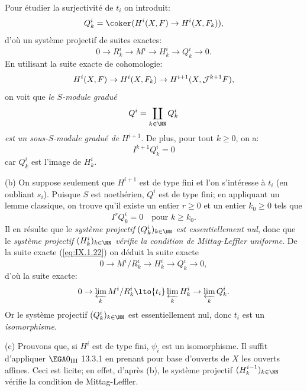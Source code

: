 Pour \'etudier la surjectivit\'e de $t_i$ on introduit:
\begin{equation} \label{eq:IX.1.21} Q_k^i = \coker (H^i(X, F) \to H^i(X, F_k)),
\end{equation}
d'o\`u un syst\`eme projectif de suites exactes:
\begin{equation} \label{eq:IX.1.22} 0\to R_k^i \to M^i \to H^i_k \to Q_k^i \to 0.
\end{equation}
En utilisant la suite exacte de cohomologie:
\begin{equation} \label{eq:IX.1.23}
H^i(X, F)\to H^i(X, F_k)\to H^{i+1}(X, {\mathcal J}^{k+1}F),
\end{equation}
on voit que \emph{le $S$-module gradué}
\begin{equation} \label{eq:IX.1.24}
Q^i=\coprod_{k \in \NN}Q^i_k
\end{equation}
\emph{est un sous-}$S$\emph{-module gradué de} $H^{i+1}$. De plus, pour tout $k\geq 0$, on a:
\begin{equation} \label{eq:IX.1.25}
I^{k+1}Q^i_k=0
\end{equation}
car $Q_k^i$ est l'image de $H^i_k$.

\textup{(b)} \label{stepb} On suppose seulement que $H^{i+1}$ est de type fini et l'on s'int\'eresse \`a $t_i$ (en oubliant $s_i$). Puisque $S$ est noeth\'erien, $Q^i$ est de type fini; en appliquant un lemme classique, on trouve qu'il existe un entier $r\geq 0$ et un entier $k_0\geq 0$ tels que
\begin{equation} \label{eq:IX.1.26}
I^rQ_k^i=0 \quad \text{pour } k\geq k_0.
\end{equation}
Il en r\'esulte que le \emph{système projectif} $(Q_k^i)_{k\in \NN}$ \emph{est essentiellement nul}, donc que le \emph{système projectif $(H_k^i)_{k\in \NN}$ vérifie la condition de Mittag-Leffler uniforme}. De la suite exacte (\ref{eq:IX.1.22}) on d\'eduit la suite exacte
\begin{equation} \label{eq:IX.1.27}
0 \to M^i/R_k^i \to H^i_k \to Q_k^i \to 0,
\end{equation}
d'o\`u la suite exacte:
\begin{equation} \label{eq:IX.1.28}
0\to\varprojlim_{k}M^i/R_k^i \lto{t_i} \varprojlim_{k}H^i_k \to \varprojlim_{k} Q_k^i.
\end{equation}
Or le syst\`eme projectif $(Q_k^i)_{k\in \NN}$ est essentiellement nul, donc $t_i$ est un \emph{isomorphisme}.

\indent\textup{(c)} Prouvons que, si $H^i$ est de type fini, $\psi_i$ est un isomorphisme. Il suffit d'appliquer $\EGA 0_{\textup{III}}$ 13.3.1 en prenant pour base d'ouverts de $X$ les ouverts affines. Ceci est licite; en effet, d'apr\`es (b), le syst\`eme projectif $(H_k^{i-1})_{k\in \NN}$ v\'erifie la condition de Mittag-Leffler.

